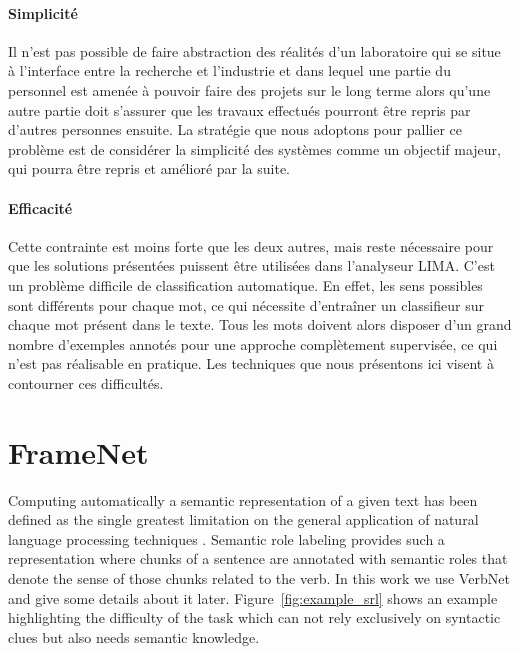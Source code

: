 \paragraph{Simplicité} Il n'est pas possible de faire abstraction des réalités
d'un laboratoire qui se situe à l'interface entre la recherche et l'industrie
et dans lequel une partie du personnel est amenée à pouvoir faire des projets
sur le long terme alors qu'une autre partie doit s'assurer que les travaux
effectués pourront être repris par d'autres personnes ensuite. La stratégie que
nous adoptons pour pallier ce problème est de considérer la simplicité des
systèmes comme un objectif majeur, qui pourra être repris et amélioré par la
suite.

\paragraph{Efficacité} Cette contrainte est moins forte que les deux autres,
mais reste nécessaire pour que les solutions présentées puissent être
utilisées dans l'analyseur LIMA.  C'est un problème difficile de
classification automatique. En effet, les sens possibles sont différents pour
chaque mot, ce qui nécessite d'entraîner un classifieur sur chaque mot présent
dans le texte. Tous les mots doivent alors disposer d'un grand nombre
d'exemples annotés pour une approche complètement supervisée, ce qui n'est pas
réalisable en pratique. Les techniques que nous présentons ici visent à
contourner ces difficultés.

\section{FrameNet}
\label{presentation_framenet}

Computing automatically a semantic representation of a given text has been
defined as the single greatest limitation on the general application of natural
language processing techniques \citep{dang1998investigating}. Semantic role
labeling provides such a representation where chunks of a sentence are
annotated with semantic roles that denote the sense of those chunks related to
the verb. In this work we use VerbNet \citep{kipperschuler2005verbnet} and give
some details about it later. Figure~\ref{fig:example_srl} shows an example
highlighting the difficulty of the task which can not rely exclusively on
syntactic clues but also needs semantic knowledge.

